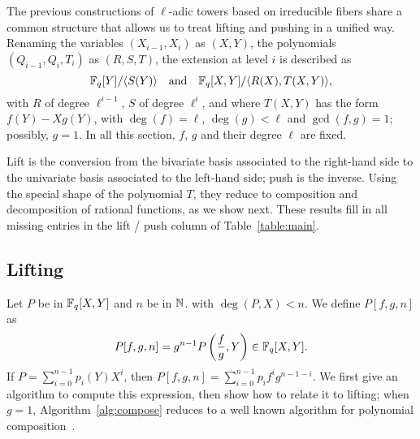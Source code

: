 \documentclass{sig-alternate}
\begin{document}
The previous constructions of $\ell$-adic towers based on irreducible
fibers share a common structure that allows us to treat lifting and
pushing in a unified way. Renaming the variables $(X_{i-1},X_i)$ as
$(X,Y)$, the polynomials $(Q_{i-1},Q_i,T_i)$ as $(R,S,T)$, the
extension at level $i$ is described as
$$\mathbb{F}_q[Y]/ \langle S(Y) \rangle \quad\text{and}\quad \mathbb{F}_q[X,Y]/\langle
R(X), T(X,Y) \rangle,$$ with $R$ of degree $\ell^{i-1}$, $S$ of degree
$\ell^i$, and where $T(X,Y)$ has the form $f(Y)-X g(Y)$, with $\deg(f)
=\ell$, $\deg(g) < \ell$ and $\gcd(f,g)=1$; possibly, $g=1$. In all
this section, $f$, $g$ and their degree $\ell$ are fixed.


Lift is the conversion from the bivariate basis associated to the
right-hand side to the univariate basis associated to the left-hand side;
push is the inverse. Using the special shape of the polynomial $T$,
they reduce to composition and decomposition of rational functions, as
we show next. These results fill in all missing entries in the lift / push 
column of Table~\ref{table:main}.



\subsection{Lifting}

Let $P$ be in $\mathbb{F}_q[X,Y]$ and $n$ be in $\mathbb{N}$. with $\deg(P,X)< n$. We
define $P[f,g,n]$ as
$$P[f,g,n] = g^{n-1} P\left (\frac fg, Y\right) \in \mathbb{F}_q[X,Y].$$ If
$P=\sum_{i=0}^{n-1} p_i(Y) X^i$, then $P[f,g,n] = \sum_{i=0}^{n-1}
p_if^ig^{n-1-i}$.  We first give an algorithm to compute this
expression, then show how to relate it to lifting; when $g=1$,
Algorithm~\ref{alg:compose} reduces to a well known algorithm for
polynomial composition~\cite[Ex.~9.20]{vzGG}.
\end{document}
